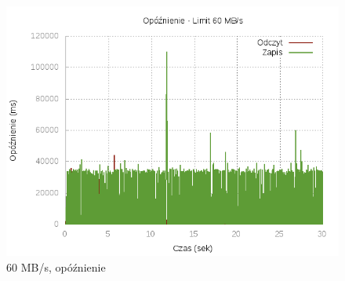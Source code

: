 \begin{figure}[h]
	\centering
	\includegraphics[scale=0.9]{results/60_lat.png}
		\caption{60 MB/s, opóźnienie}
    \label{fig:60-lat}
\end{figure}

